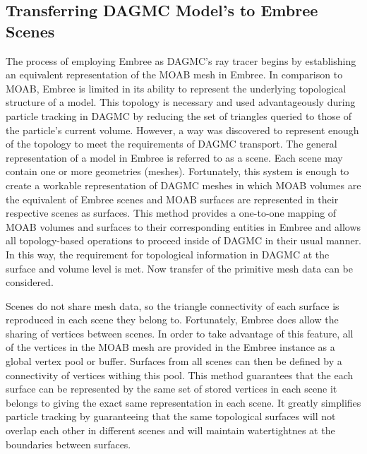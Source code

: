 \documentclass[12pt, a4paper]{article}
\begin{document}
\subsection{Transferring DAGMC Model's to Embree Scenes}%

The process of employing Embree as DAGMC's ray tracer begins by establishing an equivalent representation of the MOAB mesh in Embree. In comparison to MOAB, Embree is limited in its ability to represent the underlying topological structure of a model. This topology is necessary and used advantageously during particle tracking in DAGMC by reducing the set of triangles queried to those of the particle's current volume. However, a way was discovered to represent enough of the topology to meet the requirements of DAGMC transport. The general representation of a model in Embree is referred to as a scene. Each scene may contain one or more geometries (meshes). Fortunately, this system is enough to create a workable representation of DAGMC meshes in which MOAB volumes are the equivalent of Embree scenes and MOAB surfaces are represented in their respective scenes as surfaces. This method provides a one-to-one mapping of MOAB volumes and surfaces to their corresponding entities in Embree and allows all topology-based operations to proceed inside of DAGMC in their usual manner. In this way, the requirement for topological information in DAGMC at the surface and volume level is met. Now transfer of the primitive mesh data can be considered.

Scenes do not share mesh data, so the triangle connectivity of each surface is reproduced in each scene they belong to. Fortunately, Embree does allow the sharing of vertices between scenes. In order to take advantage of this feature, all of the vertices in the MOAB mesh are provided in the Embree instance as a global vertex pool or buffer. Surfaces from all scenes can then be defined by a connectivity of vertices withing this pool. This method guarantees that the each surface can be represented by the same set of stored vertices in each scene it belongs to giving the exact same representation in each scene. It greatly simplifies particle tracking by guaranteeing that the same topological surfaces will not overlap each other in different scenes and will maintain watertightnes at the boundaries between surfaces.
\end{document}
